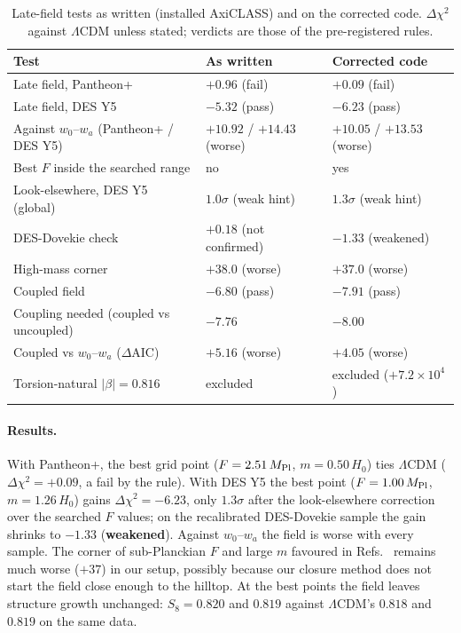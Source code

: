 \documentclass[11pt]{article}
\newcommand{\Mp}{M_{\rm Pl}}
\begin{document}
\begin{table}[h]\centering\small
\caption{Late-field tests as written (installed AxiCLASS) and on the corrected code. $\Delta\chi^2$ against
$\Lambda$CDM unless stated; verdicts are those of the pre-registered rules.}\label{tab:nr}
\begin{tabular}{lll}
\hline
Test & As written & Corrected code \\
\hline
Late field, Pantheon+ & $+0.96$ (fail) & $+0.09$ (fail) \\
Late field, DES Y5 & $-5.32$ (pass) & $-6.23$ (pass) \\
Against $w_0$--$w_a$ (Pantheon+ / DES Y5) & $+10.92$ / $+14.43$ (worse) & $+10.05$ / $+13.53$ (worse) \\
Best $F$ inside the searched range & no & yes \\
Look-elsewhere, DES Y5 (global) & $1.0\sigma$ (weak hint) & $1.3\sigma$ (weak hint) \\
DES-Dovekie check & $+0.18$ (not confirmed) & $-1.33$ (weakened) \\
High-mass corner & $+38.0$ (worse) & $+37.0$ (worse) \\
Coupled field & $-6.80$ (pass) & $-7.91$ (pass) \\
Coupling needed (coupled vs uncoupled) & $-7.76$ & $-8.00$ \\
Coupled vs $w_0$--$w_a$ ($\Delta$AIC) & $+5.16$ (worse) & $+4.05$ (worse) \\
Torsion-natural $|\beta|=0.816$ & excluded & excluded ($+7.2\times10^4$) \\
\hline
\end{tabular}\end{table}

\paragraph{Results.} With Pantheon+, the best grid point ($F=2.51\,\Mp$, $m=0.50\,H_0$) ties $\Lambda$CDM
($\Delta\chi^2=+0.09$, a fail by the rule). With DES Y5 the best point ($F=1.00\,\Mp$, $m=1.26\,H_0$) gains
$\Delta\chi^2=-6.23$, only $1.3\sigma$ after the look-elsewhere correction over the searched $F$ values; on the
recalibrated DES-Dovekie sample the gain shrinks to $-1.33$ (\textbf{weakened}). Against $w_0$--$w_a$ the field is
worse with every sample. The corner of sub-Planckian $F$ and large $m$ favoured in Refs.~\cite{lin2025,shiu2026}
remains much worse ($+37$) in our setup, possibly because our closure method does not start the field close enough to
the hilltop. At the best points the field leaves structure growth unchanged: $S_8=0.820$ and $0.819$ against
$\Lambda$CDM's $0.818$ and $0.819$ on the same data.
\end{document}
